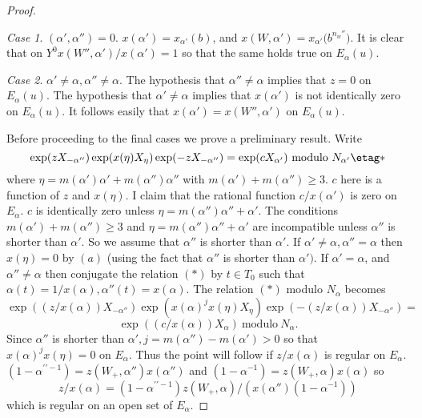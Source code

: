 \documentclass{memo-l}
\theoremstyle{definition}
\theoremstyle{remark}
\newtheorem{case}{Case}
\numberwithin{section}{chapter}
\numberwithin{equation}{chapter}
\begin{document}
\begin{proof}
\begin{case} %
$({\alpha}',{\alpha}'') = 0$.  $x({\alpha}')  = 
x_{{\alpha}'}(b)$, and $x(W,{\alpha}')  =  x_{{\alpha}'}{(b^{n_w''}})$.
It is clear that on $Y^{0}$\quad $x(W'',{\alpha}')/x({\alpha}')  =  1$ so that the
same holds true on $E_{{\alpha}}(u)$.
\end{case}

\begin{case} %
${\alpha}' \ne {\alpha}, {\alpha}'' \ne {\alpha}$.  The
hypothesis that ${\alpha}'' \ne {\alpha}$ implies that $z = 0$ on
$E_{{\alpha}}(u)$.  The hypothesis that ${\alpha}' \ne {\alpha}$ implies
that $x({\alpha}')$ is not identically zero on $E_{{\alpha}}(u)$.  It
follows easily that $x({\alpha}')  =  x(W'',{\alpha}')$ on $E_{{\alpha}}(u)$.
\end{case}


   Before proceeding to the final cases we prove a preliminary result.
Write
$$
\exp(zX_{-{\alpha}''})\exp(x({\eta})X_{{\eta}})\exp(-zX_{-{\alpha}''})  = 
\exp(cX_{{\alpha}'})\ {\text{modulo}}\ N_{{\alpha'}}  \etag *
$$
where ${\eta} = m({\alpha}'){\alpha}'+m({\alpha}''){\alpha''}$ with
$m({\alpha}')+m({\alpha}'') \ge 3$.  $c$ here is a function of $z$ and
$x({\eta})$.  I claim that the rational function $c/x({\alpha}')$ is zero
on $E_{{\alpha}}$.  $c$ is identically zero unless
$\eta = m(\alpha'')\alpha''+\alpha'$.  
The conditions
$m({\alpha}')+m({\alpha}'') \ge 3$ and $\eta = m(\alpha'')\alpha''+\alpha'$
are incompatible unless ${\alpha}''$
is shorter than ${\alpha}'$.  So we assume that ${\alpha}''$ is shorter than
${\alpha}'$.  If ${\alpha}'\ne {\alpha}, {\alpha}'' = {\alpha}$ then
$x({\eta}) = 0$ by $(a)$ (using the fact that ${\alpha}''$ is shorter than
${\alpha}')$.  If ${\alpha}' = {\alpha}$, and ${\alpha''} \ne {\alpha}$ then
conjugate the relation $(*)$ by $t  \in  T_{0}$ such that
${\alpha}(t) = 1/x({\alpha}), {\alpha}''(t) = x({\alpha})$.  The relation $(*)$
modulo $N_{{\alpha}}$ becomes
$$
\exp((z/x({\alpha}))X_{-{\alpha}''})\exp(x({\alpha})^{j}x({\eta})X_{{\eta}})
\exp(-(z/x({\alpha}))X_{-{\alpha}''})
 = 
$$
$$
\exp((c/x({\alpha}))X_{{\alpha}})\ {\text{modulo}}\  N_{{\alpha}}.
$$
Since ${\alpha}''$ is shorter than ${\alpha}', j = m({\alpha}'')-m({\alpha}')>0$
so that $x({\alpha})^{j}x({\eta}) = 0$ on $E_{{\alpha}}$.  Thus the point
will follow if $z/x({\alpha})$ is regular on $E_{{\alpha}}$.
$(1-{\alpha}^{\prime\prime-1}) = z(W_{+},{\alpha}'')x({\alpha}'')$ and $(1-{\alpha}^{-1})  = 
z(W_{+},{\alpha})x({\alpha})$ so $$z/x({\alpha})  = 
(1-{\alpha}^{\prime\prime-1})z(W_{+},{\alpha})/(x({\alpha}'')(1-{\alpha}^{-1}))$$ which is
regular on an open set of $E_{{\alpha}}$.


\end{proof}
\end{document}
